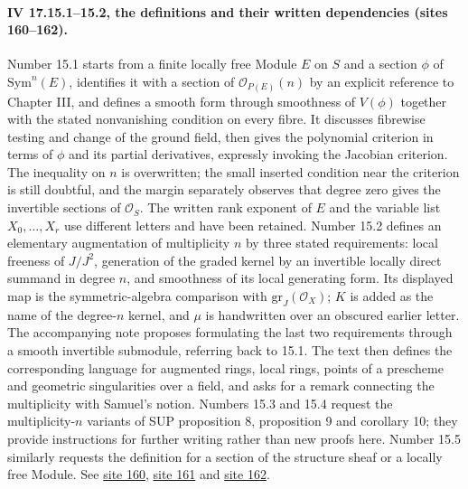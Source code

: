 \paragraph{IV 17.15.1--15.2, the definitions and their written dependencies (sites 160--162).}
Number 15.1 starts from a finite locally free Module $E$ on $S$ and a section $\phi$ of $\mathrm{Sym}^n(E)$, identifies it with a section of $\mathcal O_{P(E)}(n)$ by an explicit reference to Chapter III, and defines a smooth form through smoothness of $V(\phi)$ together with the stated nonvanishing condition on every fibre. It discusses fibrewise testing and change of the ground field, then gives the polynomial criterion in terms of $\phi$ and its partial derivatives, expressly invoking the Jacobian criterion. The inequality on $n$ is overwritten; the small inserted condition near the criterion is still doubtful, and the margin separately observes that degree zero gives the invertible sections of $\mathcal O_S$. The written rank exponent of $E$ and the variable list $X_0,\ldots,X_r$ use different letters and have been retained. Number 15.2 defines an elementary augmentation of multiplicity $n$ by three stated requirements: local freeness of $J/J^2$, generation of the graded kernel by an invertible locally direct summand in degree $n$, and smoothness of its local generating form. Its displayed map is the symmetric-algebra comparison with $\mathrm{gr}_J(\mathcal O_X)$; $K$ is added as the name of the degree-$n$ kernel, and $\mu$ is handwritten over an obscured earlier letter. The accompanying note proposes formulating the last two requirements through a smooth invertible submodule, referring back to 15.1. The text then defines the corresponding language for augmented rings, local rings, points of a prescheme and geometric singularities over a field, and asks for a remark connecting the multiplicity with Samuel's notion. Numbers 15.3 and 15.4 request the multiplicity-$n$ variants of SUP proposition 8, proposition 9 and corollary 10; they provide instructions for further writing rather than new proofs here. Number 15.5 similarly requests the definition for a section of the structure sheaf or a locally free Module. See \href{https://grothendieck.umontpellier.fr/web/viewer.html?file=../25.pdf#page=161}{site 160}, \href{https://grothendieck.umontpellier.fr/web/viewer.html?file=../25.pdf#page=162}{site 161} and \href{https://grothendieck.umontpellier.fr/web/viewer.html?file=../25.pdf#page=163}{site 162}.

